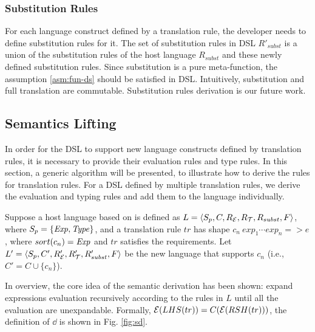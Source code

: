 \subsubsection{Substitution Rules}

For each language construct defined by a translation rule,
 the developer needs to define substitution rules for it.
The set of substitution rules in DSL $R'_{subst}$ is a union of the substitution rules of the host language $R_{subst}$ and these newly defined substitution rules.
Since substitution is a pure meta-function, the assumption \ref{asm:fun-ds} should be satisfied in DSL.
Intuitively, substitution and full translation are commutable.
Substitution rules derivation is our future work.

\subsection{Semantics Lifting}


In order for the DSL to support new language constructs defined by translation rules, 
 it is necessary to provide their evaluation rules and type rules.
In this section, a generic algorithm will be presented, 
 to illustrate how to derive the rules for translation rules.
For a DSL defined by multiple translation rules, 
 we derive the evaluation and typing rules and add them to the language individually.

Suppose a host language based on \STLC is defined as $L=\langle S_p, C, R_{\mathcal{E}}, R_{\mathcal{T}}, R_{subst}, F\rangle$,
where $S_p=\{\mathit{Exp},\mathit{Type}\}$,
and a translation rule $tr$ has shape $c_n~exp_1\cdots exp_n => e$,
where $sort(c_n)=\mathit{Exp}$ and $tr$ satisfies the requirements.
Let $L'=\langle S_p, C', R'_{\mathcal{E}}, R'_{\mathcal{T}}, R'_{subst}, F\rangle$ be the new language that supports $c_n$ (i.e., $C'=C \cup \{c_n\}$).

In overview, the core idea of the semantic derivation has been shown: 
 expand expressions evaluation recursively according to the rules in $L$ 
 until all the evaluation are unexpandable.
Formally, $\mathcal{E}(LHS(tr))=C(\mathcal{E}(RSH(tr)))$, the definition of $\dd$ is shown in Fig. \ref{fig:sd}.


